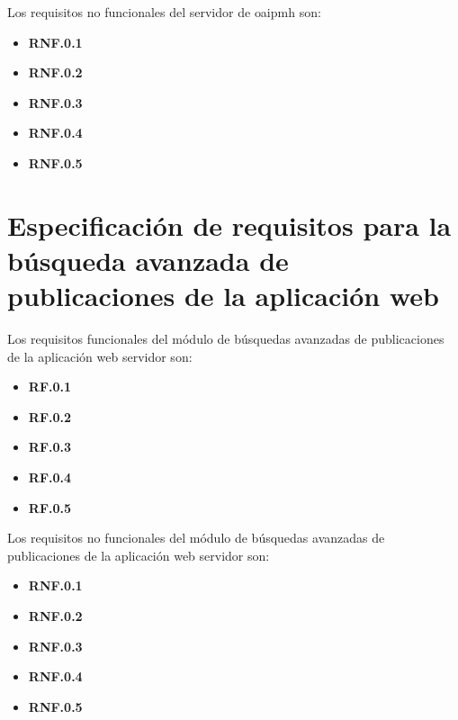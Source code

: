 Los requisitos no funcionales del servidor de \acrshort{oaipmh} son:

\begin{itemize}
	\item \textbf{RNF.0.1}

	\item \textbf{RNF.0.2}

	\item \textbf{RNF.0.3}

	\item \textbf{RNF.0.4}

	\item \textbf{RNF.0.5}	
\end{itemize}

\section{Especificación de requisitos para la búsqueda avanzada de publicaciones de la aplicación web}

Los requisitos funcionales del módulo de búsquedas avanzadas de publicaciones de la aplicación web servidor son:

\begin{itemize}
	\item \textbf{RF.0.1}

	\item \textbf{RF.0.2}

	\item \textbf{RF.0.3}

	\item \textbf{RF.0.4}

	\item \textbf{RF.0.5}	
\end{itemize}

Los requisitos no funcionales del módulo de búsquedas avanzadas de publicaciones de la aplicación web servidor son:

\begin{itemize}
	\item \textbf{RNF.0.1}

	\item \textbf{RNF.0.2}

	\item \textbf{RNF.0.3}

	\item \textbf{RNF.0.4}

	\item \textbf{RNF.0.5}	
\end{itemize}


